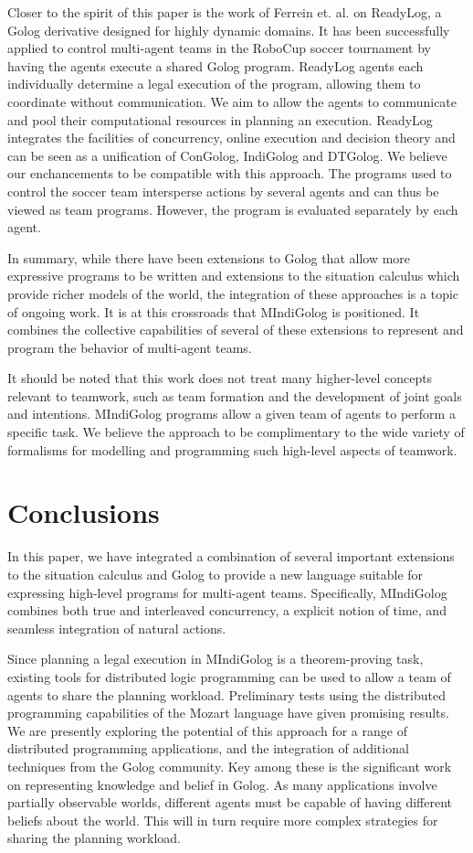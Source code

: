 \documentclass[letterpaper]{article}
\begin{document}
Closer to the spirit of this paper is the work of Ferrein et. al.
\cite{Ferrein2005readylog} on ReadyLog, a Golog derivative designed
for highly dynamic domains. It has been successfully applied to control
multi-agent teams in the RoboCup soccer tournament by having the agents
execute a shared Golog program. ReadyLog agents
each individually determine a legal execution of the program, allowing
them to coordinate without communication.  We aim to allow the agents to
communicate and pool their computational resources in planning an
execution.
ReadyLog integrates
the facilities of concurrency, online execution and decision theory
and can be seen as a unification of ConGolog, IndiGolog and DTGolog.
We believe our enchancements to be compatible with this approach.
The programs used to control the soccer team intersperse actions by
several agents and can thus be viewed as team programs. However, the
program is evaluated separately by each agent.

In summary, while there have been extensions to Golog that allow more
expressive programs to be written and extensions to the situation
calculus which provide richer models of the world, the integration
of these approaches is a topic of ongoing work. It is at this crossroads
that MIndiGolog is positioned. It combines the
collective capabilities of several of these extensions to represent and program
the behavior of multi-agent teams.

It should be noted that this work does not treat many higher-level concepts
relevant
to teamwork, such as team formation and the development of joint goals and
intentions.  MIndiGolog programs allow a given team of agents to
perform a specific task.  We believe the approach to be complimentary to
the wide variety of formalisms for modelling and programming such high-level
aspects of teamwork.

\section{Conclusions}

In this paper, we have integrated a combination of several important
extensions to the situation calculus and Golog to provide a new language
suitable for expressing high-level programs for multi-agent teams.
Specifically, MIndiGolog combines both true and interleaved concurrency,
a explicit notion of time, and seamless integration of natural actions.

Since planning a legal execution in MIndiGolog is a theorem-proving
task, existing tools for distributed logic programming can be used to
allow a team of agents to share the planning workload.  Preliminary
tests using the distributed programming capabilities of the Mozart language
\cite{vanroy99mozart} have given promising results.
We are presently exploring the potential of this approach for a range
of distributed programming applications, and the integration of additional
techniques from the Golog community. Key among
these is the significant work on representing knowledge and belief
in Golog. As many applications involve partially observable worlds,
different agents must be capable of having different beliefs about
the world.  This will in turn require more complex strategies for
sharing the planning workload.
\end{document}
